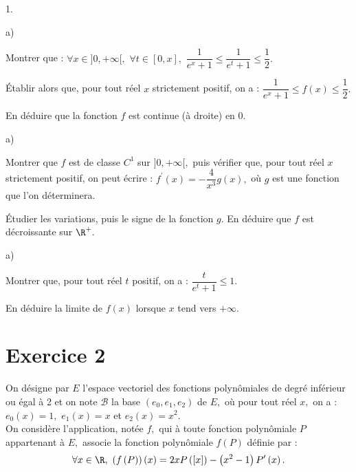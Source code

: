 \documentclass[11pt]{article}%
\begin{document}
\begin{noliste}{1.}
 \setlength{\itemsep}{4mm}
\item
\begin{noliste}{a)}
 \setlength{\itemsep}{2mm}
\item Montrer que : $\forall x\in]0, + \infty\lbrack,$ $\forall
t\in\left[
0,x\right],$ $\dfrac{1}{e^{x} + 1}\leq\dfrac{1}{e^{t} +
1}\leq\dfrac{1}{2}.$

\item Établir alors que, pour tout réel $x$ strictement positif, on a :
$\dfrac{1}{e^{x} + 1}\leq f(x)\leq\dfrac{1}{2}.$

\item En déduire que la fonction $f$ est continue (à droite) en 0.
\end{noliste}

\item
\begin{noliste}{a)}
 \setlength{\itemsep}{2mm}
\item Montrer que $f$ est de classe $C^{1}$ sur $]0, + \infty\lbrack,$
puis
vérifier que, pour tout réel $x$ strictement positif, on peut écrire :
$f^{\prime}(x) = -\dfrac{4}{x^{3}}g(x),$ où $g$ est une fonction que
l'on déterminera.

\item Étudier les variations, puis le signe de la fonction $g.$ En
déduire que
$f$ est décroissante sur $\R^{+}.$
\end{noliste}

\item
\begin{noliste}{a)}
 \setlength{\itemsep}{2mm}
\item Montrer que, pour tout réel $t$ positif, on a : $\dfrac{t}{e^{t}
+ 1}\leq1.$

\item En déduire la limite de $f(x)$ lorsque $x$ tend vers $ + \infty.$
\end{noliste}
\end{noliste}

\section*{Exercice 2}

On désigne par $E$ l'espace vectoriel des fonctions polynômiales de
degré
inférieur ou égal à 2 et on note $\mathcal{B}$ la base $\left(
e_{0},e_{1},e_{2}\right) $ de $E,$ où pour tout réel $x,$ on a :
$e_{0}\left(
x\right) = 1,$ $e_{1}\left( x\right) = x$ et $e_{2}\left( x\right) =
x^{2}.$\\
 On considère l'application, notée $f,$ qui à toute fonction
polynômiale $P$ appartenant à $E,$ associe la fonction polynômiale
$f(P)$
définie par :
\[
\forall x\in\R,\ \left( f\left( P\right) \right) \left( x\right)
 = 2xP\left(\Ev{ x}\right) -\left( x^{2}-1\right) P^{\prime}\left(
x\right).
\]
\end{document}
